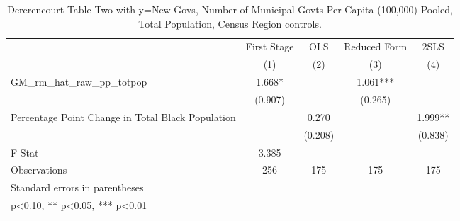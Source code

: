 \begin{table}[htbp]\centering
\def\sym#1{\ifmmode^{#1}\else\(^{#1}\)\fi}
\caption{Dererencourt Table Two with y=New Govs, Number of Municipal Govts Per Capita (100,000) Pooled, Total Population, Census Region controls.}
\begin{tabular}{l*{4}{c}}
\toprule
                    & First Stage   &         OLS   &Reduced Form   &        2SLS   \\
                    &\multicolumn{1}{c}{(1)}   &\multicolumn{1}{c}{(2)}   &\multicolumn{1}{c}{(3)}   &\multicolumn{1}{c}{(4)}   \\
\midrule
GM\_rm\_hat\_raw\_pp\_totpop&       1.668*  &               &       1.061***&               \\
                    &     (0.907)   &               &     (0.265)   &               \\
\addlinespace
Percentage Point Change in Total Black Population&               &       0.270   &               &       1.999** \\
                    &               &     (0.208)   &               &     (0.838)   \\
\midrule
F-Stat              &       3.385   &               &               &               \\
Observations        &         256   &         175   &         175   &         175   \\
\bottomrule
\multicolumn{5}{l}{\footnotesize Standard errors in parentheses}\\
\multicolumn{5}{l}{\footnotesize * p<0.10, ** p<0.05, *** p<0.01}\\
\end{tabular}
\end{table}
